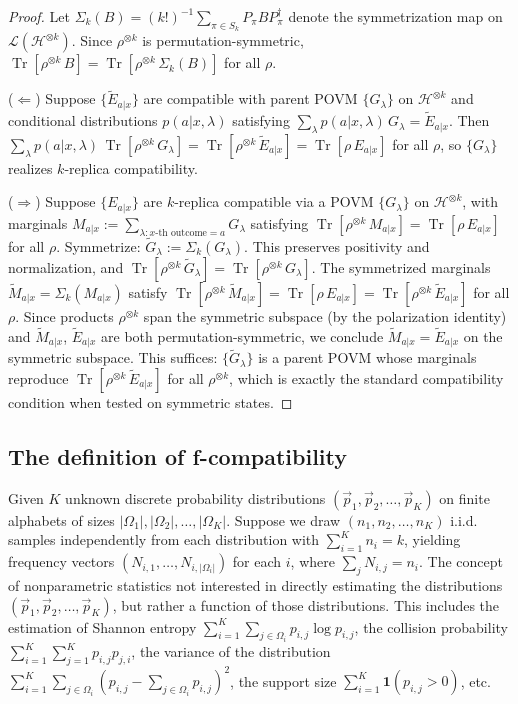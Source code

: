 \documentclass[aps,%
twocolumn,%
floatfix,%
pra,%
amsfonts,%
groupedaddress,%
superscriptaddress]{revtex4-2}%
\DeclareMathOperator{\tr}{Tr}
\newcommand{\1}{\mathbbm{1}}
\begin{document}
\begin{proof}
Let $\Sigma_k(B) = (k!)^{-1}\sum_{\pi \in S_k} P_\pi B P_\pi^\dagger$ denote the symmetrization map on $\mathcal{L}(\mathcal{H}^{\otimes k})$. Since $\rho^{\otimes k}$ is permutation-symmetric, $\tr[\rho^{\otimes k}\, B] = \tr[\rho^{\otimes k}\, \Sigma_k(B)]$ for all $\rho$.

($\Leftarrow$) Suppose $\{\tilde{E}_{a|x}\}$ are compatible with parent POVM $\{G_\lambda\}$ on $\mathcal{H}^{\otimes k}$ and conditional distributions $p(a|x,\lambda)$ satisfying $\sum_\lambda p(a|x,\lambda)\, G_\lambda = \tilde{E}_{a|x}$. Then $\sum_\lambda p(a|x,\lambda)\, \tr[\rho^{\otimes k}\, G_\lambda] = \tr[\rho^{\otimes k}\, \tilde{E}_{a|x}] = \tr[\rho\, E_{a|x}]$ for all $\rho$, so $\{G_\lambda\}$ realizes $k$-replica compatibility.

($\Rightarrow$) Suppose $\{E_{a|x}\}$ are $k$-replica compatible via a POVM $\{G_\lambda\}$ on $\mathcal{H}^{\otimes k}$, with marginals $M_{a|x} := \sum_{\lambda: x\text{-th outcome}=a} G_\lambda$ satisfying $\tr[\rho^{\otimes k}\, M_{a|x}] = \tr[\rho\, E_{a|x}]$ for all $\rho$.
Symmetrize: $\tilde{G}_\lambda := \Sigma_k(G_\lambda)$. This preserves positivity and normalization, and $\tr[\rho^{\otimes k}\, \tilde{G}_\lambda] = \tr[\rho^{\otimes k}\, G_\lambda]$. The symmetrized marginals $\tilde{M}_{a|x} = \Sigma_k(M_{a|x})$ satisfy $\tr[\rho^{\otimes k}\, \tilde{M}_{a|x}] = \tr[\rho\, E_{a|x}] = \tr[\rho^{\otimes k}\, \tilde{E}_{a|x}]$ for all $\rho$. Since products $\rho^{\otimes k}$ span the symmetric subspace (by the polarization identity) and $\tilde{M}_{a|x}$, $\tilde{E}_{a|x}$ are both permutation-symmetric, we conclude $\tilde{M}_{a|x} = \tilde{E}_{a|x}$ on the symmetric subspace. This suffices: $\{\tilde{G}_\lambda\}$ is a parent POVM whose marginals reproduce $\tr[\rho^{\otimes k}\, \tilde{E}_{a|x}]$ for all $\rho^{\otimes k}$, which is exactly the standard compatibility condition when tested on symmetric states.
\end{proof}

\subsection{The definition of f-compatibility}


Given $K$ unknown discrete probability distributions $(\vec{p}_1, \vec{p}_2, \dots, \vec{p}_K)$ on finite alphabets of sizes $|\Omega_1|, |\Omega_2|, \dots, |\Omega_K|$. Suppose we draw $(n_1, n_2, \dots, n_K)$ i.i.d. samples independently from each distribution with $\sum_{i=1}^K n_i = k$, yielding frequency vectors $(N_{i,1}, \ldots, N_{i,|\Omega_i|})$ for each $i$, where $\sum_j N_{i,j} = n_i$. 
The concept of nonparametric statistics not interested in directly estimating the distributions $(\vec{p}_1, \vec{p}_2, \dots, \vec{p}_K)$, but rather a function of those distributions. This includes the estimation of Shannon entropy $\sum_{i=1}^K \sum_{j \in \Omega_i} p_{i,j} \log p_{i,j}$, the collision probability $\sum_{i=1}^K \sum_{j=1}^K p_{i,j} p_{j,i}$, the variance of the distribution $\sum_{i=1}^K \sum_{j \in \Omega_i} (p_{i,j} - \sum_{j \in \Omega_i} p_{i,j})^2$, the support size $\sum_{i=1}^K \mathbf{1}(p_{i,j} > 0)$, etc.
\end{document}
